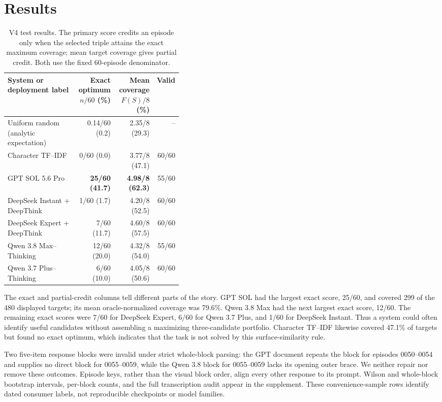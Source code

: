 \section{Results}

\begin{table}[t]
\centering
\caption{V4 test results.  The primary score credits an episode only when the
selected triple attains the exact maximum coverage; mean target coverage gives
partial credit.  Both use the fixed 60-episode denominator.}
\label{tab:main-results}
\scriptsize
\setlength{\tabcolsep}{3.2pt}
\begin{tabular}{@{}p{0.40\linewidth}rrr@{}}
\toprule
System or deployment label & \shortstack{Exact optimum\\$n/60$ (\%)} &
\shortstack{Mean coverage\\$F(S)/8$ (\%)} & Valid \\
\midrule
Uniform random (analytic expectation) & 0.14/60 (0.2) & 2.35/8 (29.3) & -- \\
Character TF--IDF & 0/60 (0.0) & 3.77/8 (47.1) & 60/60 \\
\addlinespace
GPT SOL 5.6 Pro & \textbf{25/60 (41.7)} & \textbf{4.98/8 (62.3)} & 55/60 \\
DeepSeek Instant + DeepThink & 1/60 (1.7) & 4.20/8 (52.5) & 60/60 \\
DeepSeek Expert + DeepThink & 7/60 (11.7) & 4.60/8 (57.5) & 60/60 \\
Qwen 3.8 Max--Thinking & 12/60 (20.0) & 4.32/8 (54.0) & 55/60 \\
Qwen 3.7 Plus--Thinking & 6/60 (10.0) & 4.05/8 (50.6) & 60/60 \\
\bottomrule
\end{tabular}
\end{table}

The exact and partial-credit columns tell different parts of the story.  GPT
SOL had the largest exact score, 25/60, and covered 299 of the 480 displayed
targets; its mean oracle-normalized coverage was 79.6\%.  Qwen 3.8 Max had the
next largest exact score, 12/60.  The remaining exact scores were 7/60 for
DeepSeek Expert, 6/60 for Qwen 3.7 Plus, and 1/60 for DeepSeek Instant.  Thus a
system could often identify useful candidates without assembling a maximizing
three-candidate portfolio.  Character TF--IDF likewise covered 47.1\% of
targets but found no exact optimum, which indicates that the task is not solved
by this surface-similarity rule.

Two five-item response blocks were invalid under strict whole-block parsing:
the GPT document repeats the block for episodes 0050--0054 and supplies no
direct block for 0055--0059, while the Qwen 3.8 block for 0055--0059 lacks its
opening outer brace.  We neither repair nor remove these outcomes.  Episode
keys, rather than the visual block order, align every other response to its
prompt.  Wilson and whole-block bootstrap intervals, per-block counts, and the
full transcription audit appear in the supplement.  These convenience-sample
rows identify dated consumer labels, not reproducible checkpoints or model
families.
